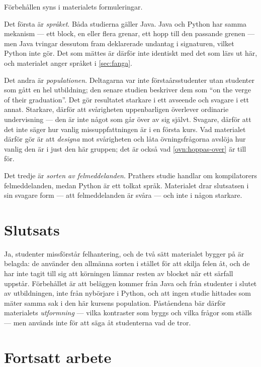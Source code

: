 Förbehållen syns i materialets formuleringar.

Det första är \emph{språket}.  Båda studierna gäller Java.  Java och
Python har samma mekanism --- ett block, en eller flera grenar, ett hopp
till den passande grenen --- men Java tvingar dessutom fram deklarerade
undantag i signaturen, vilket Python inte gör.  Det som mättes är därför
inte identiskt med det som lärs ut här, och materialet anger språket
i \cref{sec:fanga}.

Det andra är \emph{populationen}.  Deltagarna var inte förstaårsstudenter
utan studenter som gått en hel utbildning; den senare studien beskriver
dem som \enquote{on the verge of their graduation}.  Det gör resultatet
starkare i ett avseende och svagare i ett annat.  Starkare, därför att
svårigheten uppenbarligen överlever ordinarie undervisning --- den är
inte något som går över av sig självt.  Svagare, därför att det inte
säger hur vanlig missuppfattningen är i en första kurs.  Vad
materialet därför gör är att \emph{designa} mot svårigheten och låta
övningsfrågorna avslöja hur vanlig den är i just den här gruppen; det är
också vad \cref{ovn:hoppas-over} är till för.

Det tredje är \emph{sorten av felmeddelanden}.  Prathers studie
handlar om kompilatorers felmeddelanden, medan Python är ett tolkat
språk.  Materialet drar
slutsatsen i sin svagare form --- att felmeddelanden är svåra --- och
inte i någon starkare.

\section{Slutsats}
\label{sec:nyb-slutsats}

Ja, studenter missförstår felhantering, och de två sätt materialet bygger
på är belagda: de använder den allmänna sorten i stället för att skilja
felen åt, och de har inte tagit till sig att körningen lämnar resten av
blocket när ett särfall uppstår.  Förbehållet är att beläggen kommer från
Java och från studenter i slutet av utbildningen, inte från nybörjare i
Python, och att ingen studie hittades som mäter samma sak i den här
kursens population.  Påståendena bär därför materialets \emph{utformning}
--- vilka kontraster som byggs och vilka frågor som ställs --- men
används inte för att säga åt studenterna vad de tror.

\section{Fortsatt arbete}
\label{sec:nyb-fortsatt}

